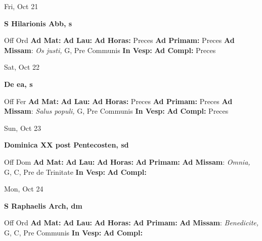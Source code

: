 \documentclass[10pt]{article}
\begin{document}
\begin{minipage}{3.5in}
\vspace{2em}\begin{center}
Fri, Oct 21
\end{center}\textbf{ \large S Hilarionis Abb, \textnormal{\normalsize s}}
\begin{justify}
Off Ord
\textbf{Ad Mat: }
\textbf{Ad Lau: }
\textbf{Ad Horas: }Preces
\textbf{Ad Primam: }Preces
\textbf{Ad Missam}: \textit{Os justi,} G, Pre Communis
\textbf{In Vesp: }
\textbf{Ad Compl: }Preces\end{justify}
\end{minipage}



\begin{minipage}{3.5in}
\vspace{2em}\begin{center}
Sat, Oct 22
\end{center}\textbf{ \large De ea, \textnormal{\normalsize s}}
\begin{justify}
Off Fer
\textbf{Ad Mat: }
\textbf{Ad Lau: }
\textbf{Ad Horas: }Preces
\textbf{Ad Primam: }Preces
\textbf{Ad Missam}: \textit{Salus populi,} G, Pre Communis
\textbf{In Vesp: }
\textbf{Ad Compl: }Preces\end{justify}
\end{minipage}



\begin{minipage}{3.5in}
\vspace{2em}\begin{center}
Sun, Oct 23
\end{center}\textbf{ \large Dominica XX post Pentecosten, \textnormal{\normalsize sd}}
\begin{justify}
Off Dom
\textbf{Ad Mat: }
\textbf{Ad Lau: }
\textbf{Ad Horas: }
\textbf{Ad Primam: }
\textbf{Ad Missam}: \textit{Omnia,} G, C, Pre de Trinitate
\textbf{In Vesp: }
\textbf{Ad Compl: }\end{justify}
\end{minipage}



\begin{minipage}{3.5in}
\vspace{2em}\begin{center}
Mon, Oct 24
\end{center}\textbf{ \large S Raphaelis Arch, \textnormal{\normalsize dm}}
\begin{justify}
Off Ord
\textbf{Ad Mat: }
\textbf{Ad Lau: }
\textbf{Ad Horas: }
\textbf{Ad Primam: }
\textbf{Ad Missam}: \textit{Benedicite,} G, C, Pre Communis
\textbf{In Vesp: }
\textbf{Ad Compl: }\end{justify}
\end{minipage}
\end{document}
